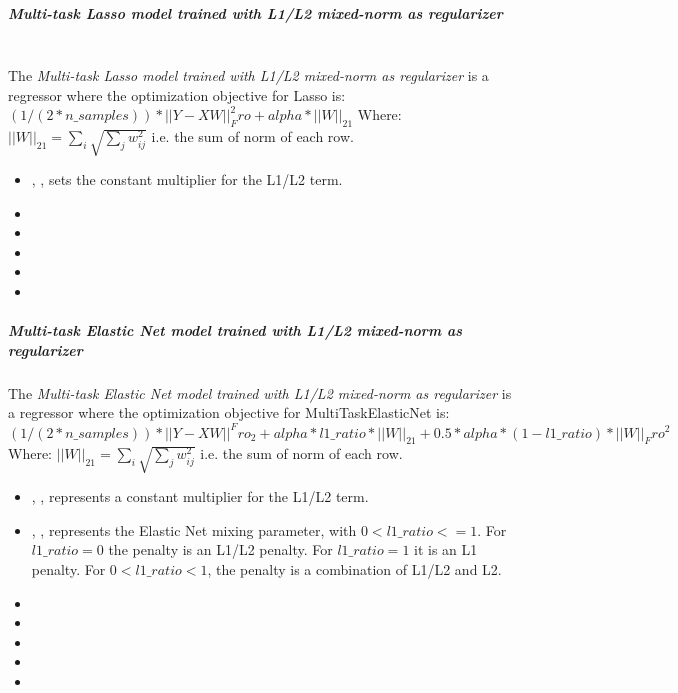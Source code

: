 \subparagraph{Multi-task Lasso model trained with L1/L2 mixed-norm as
  regularizer}
\mbox{}
\\The \textit{Multi-task Lasso model trained with L1/L2 mixed-norm as
  regularizer} is a regressor where the optimization objective for Lasso is:
$(1 / (2 * n\_samples)) * ||Y - XW||^2_Fro + alpha * ||W||_21$
Where:
$||W||_21 = \sum_i \sqrt{\sum_j w_{ij}^2}$
i.e. the sum of norm of each row.
%
\begin{itemize}
  \item {}, , sets the constant 
  multiplier for the L1/L2 term.
  \item {}
  \item {}
  \item \maxIterDescription{}
  \item {}
  \item \warmStartDescription{}
\end{itemize}

\subparagraph{Multi-task Elastic Net model trained with L1/L2 mixed-norm as
  regularizer}
\mbox{}

The \textit{Multi-task Elastic Net model trained with L1/L2 mixed-norm as
  regularizer} is a regressor where the optimization objective for
MultiTaskElasticNet is:
$(1 / (2 * n\_samples)) * ||Y - XW||^Fro_2
+ alpha * l1\_ratio * ||W||_21
+ 0.5 * alpha * (1 - l1\_ratio) * ||W||_Fro^2$
Where:
$||W||_21 = \sum_i \sqrt{\sum_j w_{ij}^2}$
i.e. the sum of norm of each row.
%
\begin{itemize}
  \item {}, , represents a constant
  multiplier for the L1/L2 term.
  \item {}, , represents the Elastic Net mixing
  parameter, with $0 < l1\_ratio <= 1$.
  For $l1\_ratio = 0$ the penalty is an L1/L2 penalty.
  For $l1\_ratio = 1$ it is an L1 penalty.
  For $0 < l1\_ratio < 1$, the penalty is a combination of L1/L2
  and L2.
  \item {}
  \item {}
  \item \maxIterDescription{}
  \item {}
  \item \warmStartDescription{}
\end{itemize}

